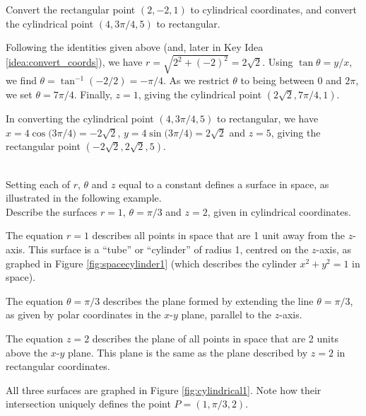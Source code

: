 {Convert the rectangular point $(2,-2,1)$ to cylindrical coordinates, and convert the cylindrical point $(4,3\pi/4,5)$ to rectangular.
}
{Following the identities given above (and, later in Key Idea \ref{idea:convert_coords}), we have $r = \sqrt{2^2+(-2)^2} = 2\sqrt{2}$. Using $\tan\theta = y/x$, we find $\theta = \tan^{-1}(-2/2) =-\pi/4$. As we restrict $\theta$ to being between $0$ and $2\pi$, we set $\theta = 7\pi/4$. Finally, $z = 1$, giving the cylindrical point $(2\sqrt2,7\pi/4,1)$.

In converting the cylindrical point $(4,3\pi/4,5)$ to rectangular, we have
$x = 4\cos\big(3\pi/4\big) = -2\sqrt{2}$, $y = 4\sin\big(3\pi/4\big) = 2\sqrt{2}$ and $z=5$, giving the rectangular point $(-2\sqrt{2},2\sqrt{2},5)$.
}\\

Setting each of $r$, $\theta$ and $z$ equal to a constant defines a surface in space, as illustrated in the following example.\\

%
{Describe the surfaces $r=1$, $\theta = \pi/3$ and $z=2$, given in cylindrical coordinates.
}
{The equation $r=1$ describes all points in space that are 1 unit away from the $z$-axis. This surface is a ``tube'' or ``cylinder'' of radius 1, centred on the $z$-axis, as graphed in Figure \ref{fig:spacecylinder1} (which describes the cylinder $x^2+y^2=1$ in space). 

The equation $\theta=\pi/3$ describes the plane formed by extending the line $\theta=\pi/3$, as given by polar coordinates in the $x$-$y$ plane, parallel to the $z$-axis.

The equation $z=2$ describes the plane of all points in space that are 2 units above the $x$-$y$ plane. This plane is the same as the plane described by $z=2$ in rectangular coordinates.

All three surfaces are graphed in Figure \ref{fig:cylindrical1}. Note how their intersection uniquely defines the point $P=(1,\pi/3,2)$.
}\\

